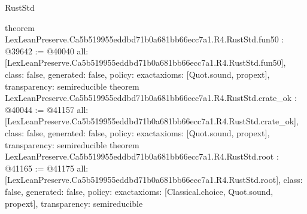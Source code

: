 \begin{lexlean}{RustStd}
\begin{coremodule}
{}
theorem LexLeanPreserve.Ca5b519955eddbd71b0a681bb66ecc7a1.R4.RustStd.fun50 : @39642 := @40040 {
  all: [LexLeanPreserve.Ca5b519955eddbd71b0a681bb66ecc7a1.R4.RustStd.fun50],
  class: false,
  generated: false,
  policy: exact{axioms: [Quot.sound, propext]},
  transparency: semireducible
}
theorem LexLeanPreserve.Ca5b519955eddbd71b0a681bb66ecc7a1.R4.RustStd.crate_ok : @40044 := @41157 {
  all: [LexLeanPreserve.Ca5b519955eddbd71b0a681bb66ecc7a1.R4.RustStd.crate_ok],
  class: false,
  generated: false,
  policy: exact{axioms: [Quot.sound, propext]},
  transparency: semireducible
}
theorem LexLeanPreserve.Ca5b519955eddbd71b0a681bb66ecc7a1.R4.RustStd.root : @41165 := @41175 {
  all: [LexLeanPreserve.Ca5b519955eddbd71b0a681bb66ecc7a1.R4.RustStd.root],
  class: false,
  generated: false,
  policy: exact{axioms: [Classical.choice, Quot.sound, propext]},
  transparency: semireducible
}


\end{coremodule}
\end{lexlean}
